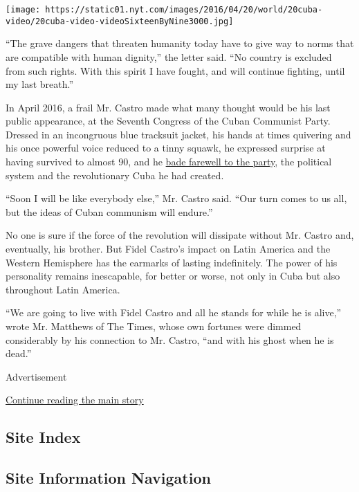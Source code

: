 \texttt{[image: https://static01.nyt.com/images/2016/04/20/world/20cuba-video/20cuba-video-videoSixteenByNine3000.jpg]}

``The grave dangers that threaten humanity today have to give way to
norms that are compatible with human dignity,'' the letter said. ``No
country is excluded from such rights. With this spirit I have fought,
and will continue fighting, until my last breath.''

In April 2016, a frail Mr. Castro made what many thought would be his
last public appearance, at the Seventh Congress of the Cuban Communist
Party. Dressed in an incongruous blue tracksuit jacket, his hands at
times quivering and his once powerful voice reduced to a tinny squawk,
he expressed surprise at having survived to almost 90, and he
\href{http://www.nytimes.com/2016/04/20/world/americas/in-farewell-fidel-castro-urges-party-to-fulfill-vision-for-cuba.html}{bade
farewell to the party}, the political system and the revolutionary Cuba
he had created.

``Soon I will be like everybody else,'' Mr. Castro said. ``Our turn
comes to us all, but the ideas of Cuban communism will endure.''

No one is sure if the force of the revolution will dissipate without Mr.
Castro and, eventually, his brother. But Fidel Castro's impact on Latin
America and the Western Hemisphere has the earmarks of lasting
indefinitely. The power of his personality remains inescapable, for
better or worse, not only in Cuba but also throughout Latin America.

``We are going to live with Fidel Castro and all he stands for while he
is alive,'' wrote Mr. Matthews of The Times, whose own fortunes were
dimmed considerably by his connection to Mr. Castro, ``and with his
ghost when he is dead.''

Advertisement

\protect\hyperlink{after-bottom}{Continue reading the main story}

\hypertarget{site-index}{%
\subsection{Site Index}\label{site-index}}

\hypertarget{site-information-navigation}{%
\subsection{Site Information
Navigation}\label{site-information-navigation}}


